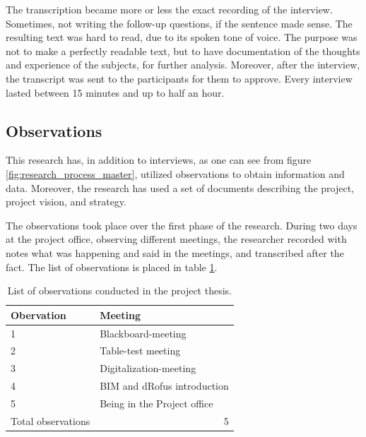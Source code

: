 The transcription became more or less the exact recording of the interview. Sometimes, not writing the follow-up questions, if the sentence made sense. The resulting text was hard to read, due to its spoken tone of voice. The purpose was not to make a perfectly readable text, but to have documentation of the thoughts and experience of the subjects, for further analysis. Moreover, after the interview, the transcript was sent to the participants for them to approve. Every interview lasted between 15 minutes and up to half an hour.

\subsection{Observations}
This research has, in addition to interviews, as one can see from figure \ref{fig:research_process_master}, utilized observations to obtain information and data. Moreover, the research has used a set of documents describing the project, project vision, and strategy. 

The observations took place over the first phase of the research. During two days at the project office, observing different meetings, the researcher recorded with notes what was happening and said in the meetings, and transcribed after the fact. The list of observations is placed in table \ref{tab:observations}. 

\begin{table}
    \begin{center}
        \begin{tabular}{p{}p{}}
        \toprule
        \textbf{Obervation} & \textbf{Meeting}              \\ \midrule
        1                   & Blackboard-meeting            \\
        2                   & Table-test meeting            \\
        3                   & Digitalization-meeting        \\
        4                   & BIM and dRofus introduction   \\
        5                   & Being in the Project office   \\
        Total observations  & \multicolumn{1}{r}{5}  \\ \bottomrule
        \end{tabular}
        \caption{List of observations conducted in the project thesis.}
        \label{tab:observations}
    \end{center}
\end{table}

